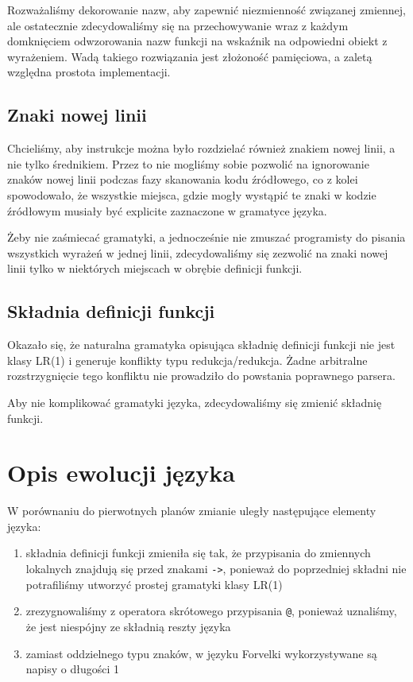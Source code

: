 \documentclass[4paper,10pt]{article}
\begin{document}
		Rozważaliśmy dekorowanie nazw, aby zapewnić niezmienność związanej zmiennej, ale ostatecznie zdecydowaliśmy się
		na przechowywanie wraz z każdym domknięciem odwzorowania nazw funkcji na wskaźnik na odpowiedni obiekt z wyrażeniem.
		Wadą takiego rozwiązania jest złożoność pamięciowa, a zaletą względna prostota implementacji.	
	
	\subsection{Znaki nowej linii}
		Chcieliśmy, aby instrukcje można było rozdzielać również znakiem nowej linii, a nie tylko średnikiem.
		Przez to nie mogliśmy sobie pozwolić na ignorowanie znaków nowej linii podczas fazy skanowania kodu źródłowego,
		co z kolei spowodowało, że wszystkie miejsca, gdzie mogły wystąpić te znaki w kodzie źródłowym
		musiały być explicite zaznaczone w gramatyce języka.

		Żeby nie zaśmiecać gramatyki, a jednocześnie nie zmuszać programisty do pisania wszystkich wyrażeń w jednej linii,
		zdecydowaliśmy się zezwolić na znaki nowej linii tylko w niektórych miejscach w obrębie definicji funkcji.
		
	
	\subsection{Składnia definicji funkcji}
		Okazało się, że naturalna gramatyka opisująca składnię definicji funkcji nie jest klasy LR(1)
		i generuje konflikty typu redukcja/redukcja.
		Żadne arbitralne rozstrzygnięcie tego konfliktu nie prowadziło do powstania poprawnego parsera.

		Aby nie komplikować gramatyki języka, zdecydowaliśmy się zmienić składnię funkcji.

\section{Opis ewolucji języka}
	W porównaniu do pierwotnych planów zmianie uległy następujące elementy języka:
	\begin{enumerate}
		\item składnia definicji funkcji zmieniła się tak, że przypisania do zmiennych lokalnych znajdują się przed znakami \texttt{->}, ponieważ do poprzedniej składni nie potrafiliśmy utworzyć prostej gramatyki klasy LR(1)
		\item zrezygnowaliśmy z operatora skrótowego przypisania \texttt{@}, ponieważ uznaliśmy, że jest niespójny ze składnią reszty języka
		\item zamiast oddzielnego typu znaków, w języku Forvelki wykorzystywane są napisy o długości 1
	\end{enumerate}
\end{document}
